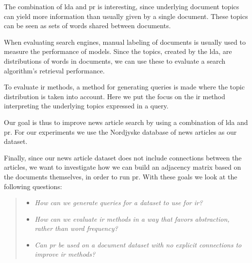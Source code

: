 The combination of \gls{lda} and \gls{pr} is interesting, since underlying document topics can yield more information than usually given by a single document.
These topics can be seen as sets of words shared between documents. 

When evaluating search engines, manual labeling of documents is usually used to measure the performance of models\cite{yang2009topic}\cite{Tang2008}.
Since the topics, created by the \gls{lda}, are distributions of words in documents, we can use these to evaluate a search algorithm's retrieval performance. 

To evaluate \gls{ir} methods, a method for generating queries is made where the topic distribution is taken into account.
Here we put the focus on the \gls{ir} method interpreting the underlying topics expressed in a query.

Our goal is thus to improve news article search by using a combination of \gls{lda} and \gls{pr}.
For our experiments we use the Nordjyske database of news articles as our dataset.



Finally, since our news article dataset does not include connections between the articles, we want to investigate how we can build an adjacency matrix based on the documents themselves, in order to run \gls{pr}.
With these goals we look at the following questions:
\begin{quote}
	\begin{itemize}
		\item \emph{How can we generate queries for a dataset to use for \gls{ir}?}
		\item \emph{How can we evaluate \gls{ir} methods in a way that favors abstraction, rather than word frequency?}
	        \item \emph{Can \gls{pr} be used on a document dataset with no explicit connections to improve \gls{ir} methods?}
	\end{itemize}
\end{quote}




